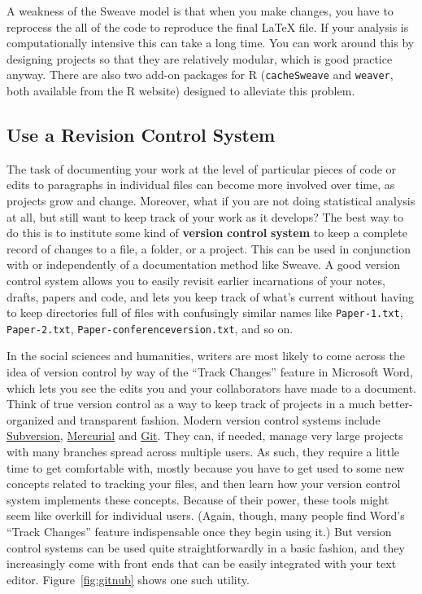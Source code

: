 \documentclass[11pt,article,oneside]{memoir}
\begin{document}
A weakness of the Sweave model is that when you make changes, you have to reprocess the all of the code to reproduce the final LaTeX file. If your analysis is computationally intensive this can take a long time. You can work around this by designing  projects so that they are relatively modular, which is good practice anyway. There are also two add-on packages for R (\texttt{cacheSweave} and \texttt{weaver}, both available from the R website) designed to alleviate this problem. 

\subsection{Use a Revision Control System}
The task of documenting your work at the level of particular pieces of code or edits to paragraphs in individual files can become more involved over time, as projects grow and change. Moreover, what if you are not doing statistical analysis at all, but still want to keep track of your work as it develops? The best way to do this is to institute some kind of \textbf{version} \textbf{control} \textbf{system} to keep a complete record of changes to a file, a folder, or a project. This can be used in conjunction with or independently of a documentation method like Sweave. A good version control system allows you to easily revisit earlier incarnations of your notes, drafts, papers and code, and lets you keep track of what's current without having to keep directories full of files with confusingly similar names like \texttt{Paper-1.txt}, \texttt{Paper-2.txt}, \texttt{Paper-conferenceversion.txt}, and so on. 

In the social sciences and humanities, writers are most likely to come across the idea of version control by way of the ``Track Changes'' feature in Microsoft Word, which lets you see the edits you and your collaborators have made to a document. Think of true version control as a way to keep track of  projects in a much better-organized and transparent fashion. Modern version control systems include \href{http://subversion.tigris.org/}{Subversion}, \href{http://www.selenic.com/mercurial/}{Mercurial} and \href{http://git.or.cz/}{Git}. They can, if needed, manage very large projects with many branches spread across multiple users. As such, they require a little time to get comfortable with, mostly because you have to get used to some new concepts related to tracking your files, and then learn how your version control system implements these concepts. Because of their power, these tools might seem like overkill for individual users. (Again, though, many people find Word's ``Track Changes'' feature indispensable once they begin using it.) But version control systems can be used quite straightforwardly in a basic fashion, and they increasingly come with front ends that can be easily integrated with your text editor. Figure~\ref{fig:gitnub} shows one such utility.     
\end{document}

